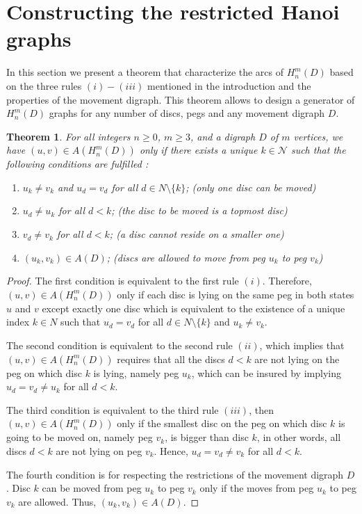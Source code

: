 \documentclass[letterpaper,11pt]{article}
\newtheorem{theorem}{Theorem}
\begin{document}
\section{Constructing the restricted Hanoi graphs}
In this section we present a theorem that characterize   the arcs of $H_{n}^{m}(D)$ based on the three rules $(i)-(iii)$ mentioned in the introduction and the properties of the movement digraph. This theorem allows to design a generator of $H_{n}^{m}(D)$ graphs for any number of discs, pegs and any movement digraph $D$.

\begin{theorem}
\label{theoremI} For all integers $n\geq0$, $m\geq 3$, and a digraph $D$ of $m$ vertices, we have  $(u,v)\in A(H_{n}^{m}(D))$ only if there exists a unique  $ k \in \mathcal{N}$ such that the following conditions are fulfilled :
\begin{enumerate}
    \item $u_{k}\neq v_{k}$ and  $u_{d}=v_{d}$ for all $d\in N\setminus\{k\}$; (only one disc can be moved)
    \item $u_{d}\neq u_{k}$  for all $d<k$; (the disc to be moved is a topmost disc) 
    \item  $v_{d}\neq v_{k}$ for all $d<k$; (a disc cannot reside on a smaller one) 
    \item $(u_{k},v_{k})\in A(D)$; (discs are allowed to move from peg $u_{k}$ to peg $v_{k}$)
\end{enumerate}
    
\end{theorem}
\begin{proof}
    The first condition is equivalent to the first rule $(i)$. Therefore,  $(u,v)\in A(H_{n}^{m}(D))$ only if each disc is lying on the same peg in both states $u$ and $v$ except exactly one disc which is equivalent to the existence of a unique index $k\in N$ such that $u_{d}=v_{d}$ for all $d\in N\setminus\{k\}$ and $u_{k}\neq v_{k}$.

    The second condition is equivalent to the second rule $(ii)$, which implies that   $(u,v)\in A(H_{n}^{m}(D))$ requires that all the discs $d<k$ are not lying on the peg on which disc $k$ is lying, namely peg $u_{k}$, which can be insured by implying  $u_{d}=v_{d}\neq u_{k}$ for all $d<k$.

    The third condition is equivalent to the third rule $(iii)$, then $(u,v)\in A(H_{n}^{m}(D))$ only if the smallest disc on the peg on which disc $k$ is going to be moved on, namely peg $v_{k}$, is bigger than disc $k$, in other words, all discs $d<k$ are not lying on peg $v_{k}$. Hence, $u_{d}=v_{d}\neq v_{k}$ for all $d<k$.

    The fourth condition is for respecting the restrictions of the movement digraph $D$. Disc $k$ can be moved from peg $u_{k}$ to peg $v_{k}$ only if the moves from peg $u_{k}$ to peg $v_{k}$ are allowed. Thus, $(u_{k},v_{k})\in A(D)$.

    

    
\end{proof}
\end{document}
